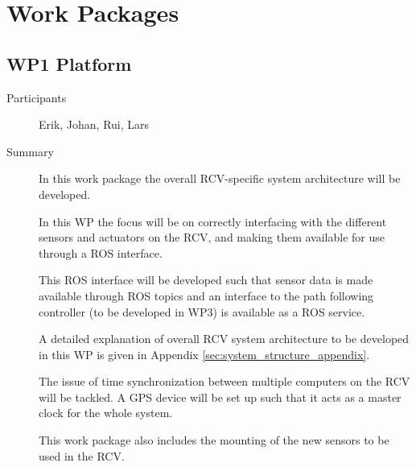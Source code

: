 \documentclass[11pt,a4paper]{article}
\begin{document}
\section{Work Packages}

\subsection{WP1 Platform} %

\begin{description}
\item[Participants] Erik, Johan, Rui, Lars
\item[Summary] In this work package the overall RCV-specific system architecture will be developed.


In this WP the focus will be on correctly interfacing with the different sensors and actuators on the RCV, and making them available for use through a ROS interface.

This ROS interface will be developed such that sensor data is made available through ROS topics and an interface to the path following controller (to be developed in WP3) is available as a ROS service.

A detailed explanation of overall RCV system architecture to be developed in this WP is given in Appendix \ref{sec:system_structure_appendix}.

The issue of time synchronization between multiple computers on the RCV will be tackled. A GPS device will be set up such that it acts as a master clock for the whole system.

This work package also includes the mounting of the new sensors to be used in the RCV.



\end{description}
\end{document}
